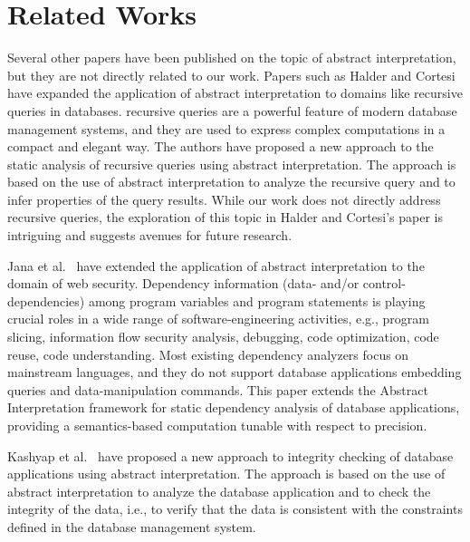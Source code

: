 \section{Related Works}\label{sec:related-works}
Several other papers have been published on the topic of abstract interpretation, but they are not directly related to our work.
Papers such as Halder and Cortesi~\cite{halder_abstract_2012} have expanded the application of abstract interpretation to domains like recursive queries in databases.
recursive queries are a powerful feature of modern database management systems, and they are used to express complex computations in a compact and elegant way.
The authors have proposed a new approach to the static analysis of recursive queries using abstract interpretation.
The approach is based on the use of abstract interpretation to analyze the recursive query and to infer properties of the query results.
While our work does not directly address recursive queries, the exploration of this topic in Halder and Cortesi's paper is intriguing and suggests avenues for future research.


Jana et al.~\cite{jana_extending_2020} have extended the application of abstract interpretation to the domain of web security.
Dependency information (data- and/or control-dependencies) among program variables and program statements is playing crucial roles in a wide range of software-engineering activities, e.g., program slicing, information flow security analysis, debugging, code optimization, code reuse, code understanding.
Most existing dependency analyzers focus on mainstream languages, and they do not support database applications embedding queries and data-manipulation commands.
This paper extends the Abstract Interpretation framework for static dependency analysis of database applications, providing a semantics-based computation tunable with respect to precision.

Kashyap et al.~\cite{kashyap_integrity_2022} have proposed a new approach to integrity checking of database applications using abstract interpretation.
The approach is based on the use of abstract interpretation to analyze the database application and to check the integrity of the data, i.e., to verify that the data is consistent with the constraints defined in the database management system.
